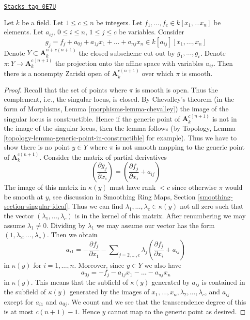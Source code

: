 \begin{lemma}
\label{examples-defos-lemma-jouanolou-type-thing}
\href{https://stacks.math.columbia.edu/tag/0E7U}{\texttt{Stacks tag 0E7U}}

Let $k$ be a field. Let $1 \leq c \leq n$ be integers.
Let $f_1, \ldots, f_c \in k[x_1, \ldots x_n]$ be elements.
Let $a_{ij}$, $0 \leq i \leq n$, $1 \leq j \leq c$ be
variables. Consider
$$
g_j = f_j + a_{0j} + a_{1j}x_1 + \ldots + a_{nj}x_n \in
k[a_{ij}][x_1, \ldots, x_n]
$$
Denote $Y \subset \mathbf{A}^{n + c(n + 1)}_k$
the closed subscheme cut out by $g_1, \ldots, g_c$.
Denote $\pi : Y \to \mathbf{A}^{c(n + 1)}_k$ the projection
onto the affine space with variables $a_{ij}$.
Then there is a nonempty Zariski open
of $\mathbf{A}^{c(n + 1)}_k$ over which $\pi$ is smooth.
\end{lemma}

\begin{proof}
Recall that the set of points where $\pi$ is smooth is open.
Thus the complement, i.e., the singular locus, is closed.
By Chevalley's theorem (in the form of
Morphisms, Lemma \ref{morphisms-lemma-chevalley})
the image of the singular locus is constructible.
Hence if the generic point of $\mathbf{A}^{c(n + 1)}_k$
is not in the image of the singular locus, then
the lemma follows (by Topology, Lemma
\ref{topology-lemma-generic-point-in-constructible} for example).
Thus we have to show there is no point
$y \in Y$ where $\pi$ is not smooth mapping to
the generic point of $\mathbf{A}^{c(n + 1)}_k$.
Consider the matrix of partial derivatives
$$
(\frac{\partial g_j}{\partial x_i}) =
(\frac{\partial f_j}{\partial x_i} + a_{ij})
$$
The image of this matrix in $\kappa(y)$ must have rank $< c$
since otherwise $\pi$ would be smooth at $y$, see discussion in
Smoothing Ring Maps, Section \ref{smoothing-section-singular-ideal}.
Thus we can find $\lambda_1, \ldots, \lambda_c \in \kappa(y)$
not all zero such that the vector $(\lambda_1, \ldots, \lambda_c)$
is in the kernel of this matrix.
After renumbering we may assume $\lambda_1 \not = 0$.
Dividing by $\lambda_1$ we may assume our vector has
the form $(1, \lambda_2, \ldots, \lambda_c)$.
Then we obtain
$$
a_{i1} = -
\frac{\partial f_j}{\partial x_1} -
\sum\nolimits_{j = 2, \ldots, c} \lambda_j(\frac{\partial f_j}{\partial x_i} + a_{ij})
$$
in $\kappa(y)$ for $i = 1, \ldots, n$. Moreover, since $y \in Y$ we also
have
$$
a_{0j} = -f_j - a_{1j}x_1 - \ldots - a_{nj}x_n
$$
in $\kappa(y)$. This means that the subfield of $\kappa(y)$
generated by $a_{ij}$ is contained in the subfield of $\kappa(y)$
generated by the images of $x_1, \ldots, x_n, \lambda_2, \ldots, \lambda_c$,
and $a_{ij}$ except for $a_{i1}$ and $a_{0j}$.
We count and we see that the transcendence degree of this is
at most $c(n + 1) - 1$. Hence $y$ cannot map to the generic point
as desired.
\end{proof}

